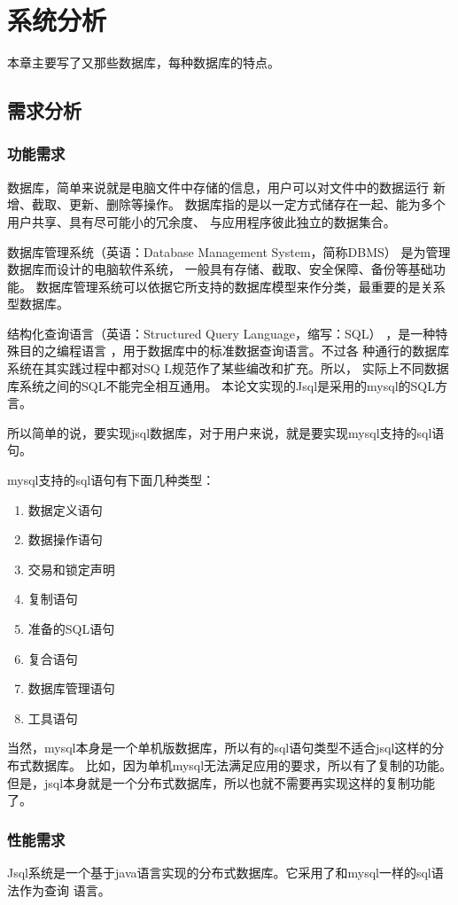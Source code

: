
\chapter{系统分析}
本章主要写了又那些数据库，每种数据库的特点。
\section{需求分析}
\subsection{功能需求}
数据库，简单来说就是电脑文件中存储的信息，用户可以对文件中的数据运行
新增、截取、更新、删除等操作。
数据库指的是以一定方式储存在一起、能为多个用户共享、具有尽可能小的冗余度、
与应用程序彼此独立的数据集合。

数据库管理系统（英语：Database Management System，简称DBMS）
是为管理数据库而设计的电脑软件系统，
一般具有存储、截取、安全保障、备份等基础功能。
数据库管理系统可以依据它所支持的数据库模型来作分类，最重要的是关系型数据库。

结构化查询语言（英语：Structured Query Language，缩写：SQL）
，是一种特殊目的之编程语言
，用于数据库中的标准数据查询语言。不过各
种通行的数据库系统在其实践过程中都对SQ
L规范作了某些编改和扩充。所以，
实际上不同数据库系统之间的SQL不能完全相互通用。
本论文实现的Jsql是采用的mysql的SQL方言。

所以简单的说，要实现jsql数据库，对于用户来说，就是要实现mysql支持的sql语句。

mysql支持的sql语句有下面几种类型：
\begin{enumerate}
	\item 数据定义语句
	\item 数据操作语句
	\item 交易和锁定声明
	\item 复制语句
	\item 准备的SQL语句
	\item 复合语句
	\item 数据库管理语句
	\item 工具语句
\end{enumerate}

当然，mysql本身是一个单机版数据库，所以有的sql语句类型不适合jsql这样的分布式数据库。
比如，因为单机mysql无法满足应用的要求，所以有了复制的功能。
但是，jsql本身就是一个分布式数据库，所以也就不需要再实现这样的复制功能了。
\subsection{性能需求}
Jsql系统是一个基于java语言实现的分布式数据库。它采用了和mysql一样的sql语法作为查询
语言。

